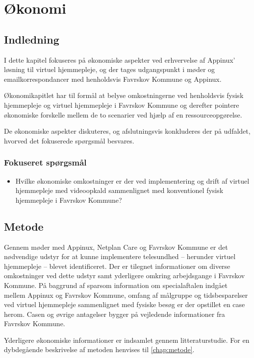 \chapter{Økonomi}
\section{Indledning}
I dette kapitel fokuseres på økonomiske aspekter ved erhvervelse af Appinux’ løsning til virtuel hjemmepleje, og der tages udgangspunkt i møder og emailkorrespondancer med henholdsvis Favrskov Kommune og Appinux. 

Økonomikapitlet har til formål at belyse omkostningerne ved henholdsvis fysisk hjemmepleje og virtuel hjemmepleje i Favrskov Kommune og derefter pointere økonomiske forskelle mellem de to scenarier ved hjælp af en ressourceopgørelse.

De økonomiske aspekter diskuteres, og afslutningsvis konkluderes der på udfaldet, hvorved det fokuserede spørgsmål besvares. 

\subsection{Fokuseret spørgsmål}
\begin{itemize}
	\item Hvilke økonomiske omkostninger er der ved implementering og drift af virtuel hjemmepleje med videoopkald sammenlignet med konventionel fysisk hjemmepleje i Favrskov Kommune?
\end{itemize}

\section{Metode}
Gennem møder med Appinux, Netplan Care og Favrskov Kommune er det nødvendige udstyr for at kunne implementere telesundhed – herunder virtuel hjemmepleje – blevet identificeret. 
Der er tilegnet informationer om diverse omkostninger ved dette udstyr samt yderligere omkring arbejdsgange i Favrskov Kommune.
På baggrund af sparsom information om specialaftalen indgået mellem Appinux og Favrskov Kommune, omfang af målgruppe og tidsbesparelser ved virtuel hjemmepleje sammenlignet med fysiske besøg er der opstillet en case herom. Casen og øvrige antagelser bygger på vejledende informationer fra Favrskov Kommune.

Yderligere økonomiske informationer er indsamlet gennem litteraturstudie. For en dybdegående beskrivelse af metoden henvises til \vref{chap:metode}. 

